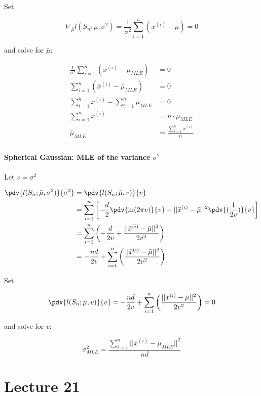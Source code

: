 \documentclass[12pt]{article}
\begin{document}
Set 

\[ \nabla_{\bar{\mu}} l(S_n; \bar{\mu}, \sigma^2) = \frac 1 {\sigma^2} \sum_{i=1}^n (\bar x^{(i)} - \bar{\mu}) = 0 \]

and solve for $\bar{\mu}$:

\[ 
	\begin{aligned}
		\frac 1 {\sigma^2} \sum_{i=1}^n (\bar x^{(i)} - \bar{\mu}_{MLE}) &= 0\\
		\sum_{i=1}^n (\bar x^{(i)} - \bar{\mu}_{MLE}) &= 0\\
		\sum_{i=1}^n \bar x^{(i)} - \sum_{i=1}^n \bar{\mu}_{MLE} &= 0\\
		\sum_{i=1}^n \bar x^{(i)} &= n \cdot \bar{\mu}_{MLE}\\
		\bar{\mu}_{MLE} &= \frac {\sum_{i=1}^n \bar x^{(i)}} n\\
	\end{aligned}
\]

\newpage

\subsection{Spherical Gaussian: MLE of the variance $\sigma^2$}

Let $v = \sigma^2$

\[ 
	\begin{aligned}
		\pdv {l(S_n; \bar{\mu}, \sigma^2)}{\sigma^2} &= \pdv {l(S_n; \bar{\mu}, v)}{v}\\
																								 &= \sum_{i=1}^n \left[-\frac d 2 \pdv {\ln (2 \pi v)}{v} - ||\bar x^{(i)} - \bar{\mu}||^2 \pdv {(\frac 1 {2v})}{v} \right]\\
																								 &= \sum_{i=1}^n \left(-\frac d {2v} + \frac {||\bar x^{(i)} - \bar{\mu}||^2} {2v^2} \right)\\
																								 &= -\frac {nd} {2v} + \sum_{i=1}^n \left(\frac {||\bar x^{(i)} - \bar{\mu}||^2} {2v^2} \right)\\
	\end{aligned}
\]

Set

\[ \pdv {l(S_n; \bar{\mu}, v)}{v} = -\frac {nd} {2v} + \sum_{i=1}^n \left(\frac {||\bar x^{(i)} - \bar{\mu}||^2} {2v^2} \right) = 0 \]

and solve for $v$:

\[ \sigma^2_{MLE} = \frac {\sum_{i=1}^n ||\bar x^{(i)} - \bar{\mu}_{MLE}||^2} {nd} \]


\part{Lecture 21}
\end{document}
